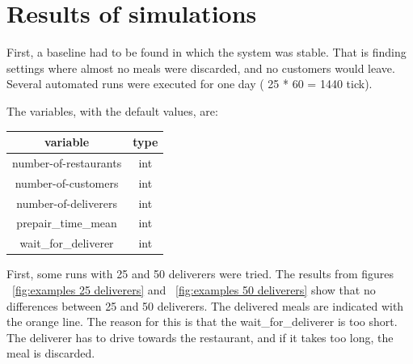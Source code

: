 \section{Results of simulations}\label{sec:results-of-simulations}
First, a baseline had to be found in which the system was stable.
That is finding settings where almost no meals were discarded, and no customers would leave.
Several automated runs were executed for one day ( 25 * 60 = 1440 tick).

The variables, with the default values, are:

\begin{center}
    \begin{tabular}{ |c|c| }
        \hline
        variable              & type \\
        \hline
        \hline
        number-of-restaurants & int  \\
        \hline
        number-of-customers   & int  \\
        \hline
        number-of-deliverers  & int  \\
        \hline
        prepair\_time\_mean   & int  \\
        \hline
        wait\_for\_deliverer  & int  \\
        \hline
    \end{tabular}
\end{center}

First, some runs with 25 and 50 deliverers were tried.
The results from figures ~\ref{fig:examples 25 deliverers} and ~\ref{fig:examples 50 deliverers} show that no differences between
25 and 50 deliverers.
The delivered meals are indicated with the orange line.
The reason for this is that the wait\_for\_deliverer is too short.
The deliverer has to drive towards the restaurant, and if it takes too long, the meal is discarded.

